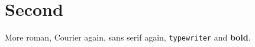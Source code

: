 \chapter{Second}
More roman, {\selectfont Courier again}, \textsf{sans serif
again}, \texttt{typewriter} and \textbf{bold}.

